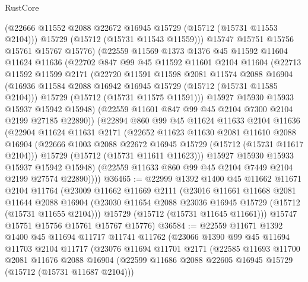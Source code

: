 \begin{lexlean}{RustCore}
\begin{coremodule}
          (@22666 @11552 @2088 @22672 @16945 @15729 (@15712 (@15731 @11553 @2104)))
          @15729
          (@15712 (@15731 @11543 @11559)))
        @15747
        @15751
        @15756
        @15761
        @15767
        @15776)
      (@22559
        @11569
        @1373
        @1376
        @45
        @11592
        @11604
        @11624
        @11636
        (@22702
          @847
          @99
          @45
          @11592
          @11601
          @2104
          @11604
          (@22713
            @11592
            @11599
            @2171
            (@22720
              @11591
              @11598
              @2081
              @11574
              @2088
              @16904
              (@16936 @11584 @2088 @16942 @16945 @15729 (@15712 (@15731 @11585 @2104)))
              @15729
              (@15712 (@15731 @11575 @11591)))
            @15927
            @15930
            @15933
            @15937
            @15942
            @15948)
          (@22559 @11601 @847 @99 @45 @2104 @7300 @2104 @2199 @27185 @22890))
        (@22894
          @860
          @99
          @45
          @11624
          @11633
          @2104
          @11636
          (@22904
            @11624
            @11631
            @2171
            (@22652
              @11623
              @11630
              @2081
              @11610
              @2088
              @16904
              (@22666 @1003 @2088 @22672 @16945 @15729 (@15712 (@15731 @11617 @2104)))
              @15729
              (@15712 (@15731 @11611 @11623)))
            @15927
            @15930
            @15933
            @15937
            @15942
            @15948)
          (@22559 @11633 @860 @99 @45 @2104 @7449 @2104 @2199 @27574 @22890))))
@36465 := @22999
    @1392
    @1400
    @45
    @11662
    @11671
    @2104
    @11764
    (@23009
      @11662
      @11669
      @2111
      (@23016
        @11661
        @11668
        @2081
        @11644
        @2088
        @16904
        (@23030 @11654 @2088 @23036 @16945 @15729 (@15712 (@15731 @11655 @2104)))
        @15729
        (@15712 (@15731 @11645 @11661)))
      @15747
      @15751
      @15756
      @15761
      @15767
      @15776)
@36584 := @22559
    @11671
    @1392
    @1400
    @45
    @11694
    @11717
    @11741
    @11762
    (@23066
      @1390
      @99
      @45
      @11694
      @11703
      @2104
      @11717
      (@23076
        @11694
        @11701
        @2171
        (@22585
          @11693
          @11700
          @2081
          @11676
          @2088
          @16904
          (@22599 @11686 @2088 @22605 @16945 @15729 (@15712 (@15731 @11687 @2104)))

\end{coremodule}
\end{lexlean}
